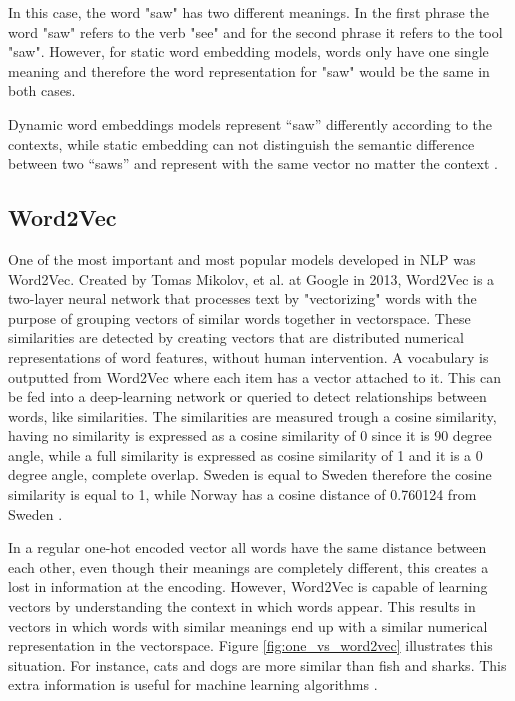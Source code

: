     \par In this case, the word "saw" has two different meanings. In the first phrase the word "saw" refers to the verb "see" and for the second phrase it refers to the tool "saw". However, for static word embedding models, words only have one single meaning and therefore  the word representation for "saw" would be the same in both cases.

    Dynamic word embeddings models represent “saw” differently according to the contexts, while static embedding can not distinguish the semantic difference between two “saws” and represent with the same vector no matter the context \cite{Wang2020} \cite{Batista2018}.

   
        \subsection{Word2Vec}

        One of the most important and most popular models developed in NLP was Word2Vec. Created by Tomas Mikolov, et al. \cite{Mikolov2013} at Google in 2013, Word2Vec is a two-layer neural network that processes text by "vectorizing" words with the purpose of grouping vectors of similar words together in vectorspace. These similarities are detected by creating vectors that are distributed numerical representations of word features, without human intervention. A vocabulary is outputted from Word2Vec where each item has a vector attached to it. This can be fed into a deep-learning network or queried to detect relationships between words, like similarities. The similarities are measured trough a cosine similarity, having no similarity is expressed as a cosine similarity of 0 since it is 90 degree angle, while a full similarity is expressed as cosine similarity of 1 and it is a 0 degree angle, complete overlap. Sweden is equal to Sweden therefore the cosine similarity is equal to 1, while Norway has a cosine distance of 0.760124 from Sweden \cite{Wiki}.
        
        


        In a regular one-hot encoded vector all words have the same distance between each other, even though their meanings are completely different, this creates a lost in information at the encoding.  However, Word2Vec is capable of learning vectors by understanding the context in which words appear. This results in vectors in which words with similar meanings end up with a similar numerical representation in the vectorspace. Figure \ref{fig:one_vs_word2vec} illustrates this situation. For instance, cats and dogs are more similar than fish and sharks. This extra information is useful for machine learning algorithms \cite{word2vec_explained}.	


